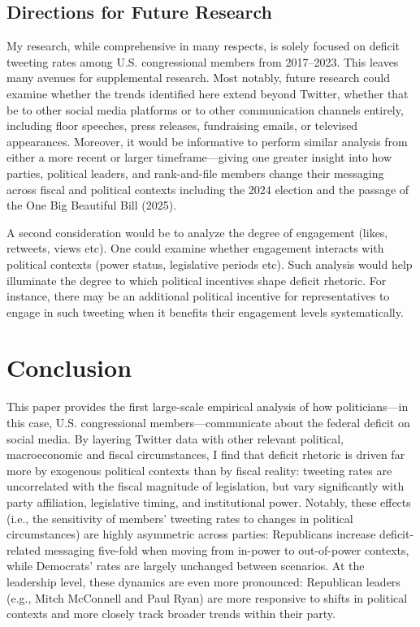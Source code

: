 \documentclass[
  12pt,
]{article}
\begin{document}
\subsection{Directions for Future
Research}\label{directions-for-future-research}

My research, while comprehensive in many respects, is solely focused on
deficit tweeting rates among U.S. congressional members from 2017--2023.
This leaves many avenues for supplemental research. Most notably, future
research could examine whether the trends identified here extend beyond
Twitter, whether that be to other social media platforms or to other
communication channels entirely, including floor speeches, press
releases, fundraising emails, or televised appearances. Moreover, it
would be informative to perform similar analysis from either a more
recent or larger timeframe---giving one greater insight into how
parties, political leaders, and rank-and-file members change their
messaging across fiscal and political contexts including the 2024
election and the passage of the One Big Beautiful Bill (2025).

A second consideration would be to analyze the degree of engagement
(likes, retweets, views etc). One could examine whether engagement
interacts with political contexts (power status, legislative periods
etc). Such analysis would help illuminate the degree to which political
incentives shape deficit rhetoric. For instance, there may be an
additional political incentive for representatives to engage in such
tweeting when it benefits their engagement levels systematically.

\section{Conclusion}\label{conclusion}

This paper provides the first large-scale empirical analysis of how
politicians---in this case, U.S. congressional members---communicate
about the federal deficit on social media. By layering Twitter data with
other relevant political, macroeconomic and fiscal circumstances, I find
that deficit rhetoric is driven far more by exogenous political contexts
than by fiscal reality: tweeting rates are uncorrelated with the fiscal
magnitude of legislation, but vary significantly with party affiliation,
legislative timing, and institutional power. Notably, these effects
(i.e., the sensitivity of members' tweeting rates to changes in
political circumstances) are highly asymmetric across parties:
Republicans increase deficit-related messaging five-fold when moving
from in-power to out-of-power contexts, while Democrats' rates are
largely unchanged between scenarios. At the leadership level, these
dynamics are even more pronounced: Republican leaders (e.g., Mitch
McConnell and Paul Ryan) are more responsive to shifts in political
contexts and more closely track broader trends within their party.
\end{document}
